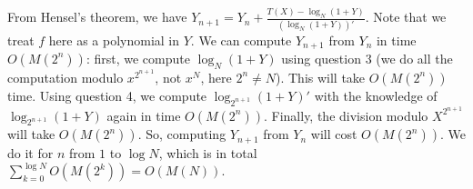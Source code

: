 \documentclass[11pt]{exam}
\theoremstyle{definition}
\begin{document}
\begin{questions}
\begin{solution}
		From Hensel's theorem, we have $Y_{n+1} = Y_n + \frac{T(X)-\log_N(1+Y)}{(\log_N(1+Y))'}.$  Note that we treat $f$ here as a polynomial in $Y$.
		We can compute $Y_{n+1}$ from $Y_n$ in time $O(M(2^n))$: first, we compute $\log_N(1+Y)$ using question 3 (we do all the computation modulo $x^{2^{n+1}}$, not $x^N$, here $2^n \neq N$). This will take $O(M(2^n))$ time. Using question 4, we compute $\log_{2^{n+1}}(1+Y)'$ with the knowledge of $\log_{2^{n+1}}(1+Y)$ again in time $O(M(2^n))$. Finally, the division modulo $X^{2^{n+1}}$ will take $O(M(2^n))$. So, computing $Y_{n+1}$ from $Y_n$ will cost $O(M(2^n))$. We do it for $n$ from $1$ to $\log N$, which is in total $\sum_{k=0}^{\log N} O(M(2^k)) = O(M(N))$.
	\end{solution}
\end{questions}

%
%
%	
\end{document}
